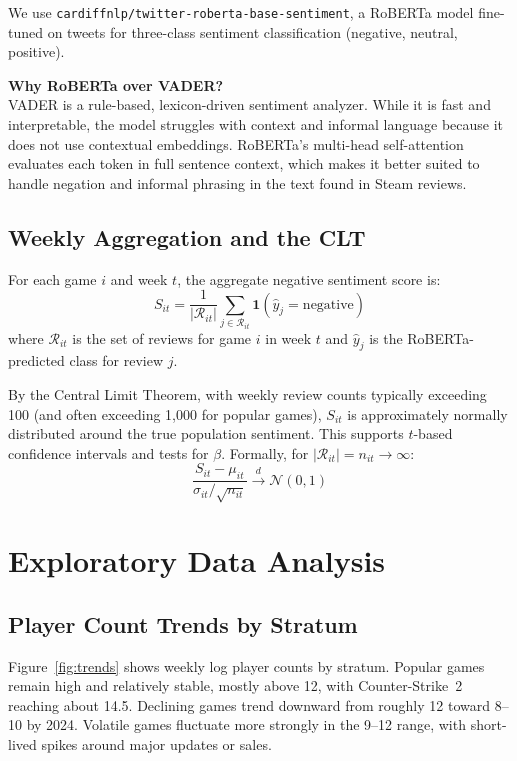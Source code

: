 \documentclass[11pt, letterpaper]{article}
\begin{document}
We use \texttt{cardiffnlp/twitter-roberta-base-sentiment}, a RoBERTa model fine-tuned on tweets for three-class sentiment classification (negative, neutral, positive).

\medskip\noindent\textbf{Why RoBERTa over VADER?}
\\VADER is a rule-based, lexicon-driven sentiment analyzer.
While it is fast and interpretable, the model struggles with context and informal language because it does not use contextual embeddings.
RoBERTa's multi-head self-attention evaluates each token in full sentence context, which makes it better suited to handle negation and informal phrasing in the text found in Steam reviews.

\subsection{Weekly Aggregation and the CLT}

For each game $i$ and week $t$, the aggregate negative sentiment score is:
\begin{equation}
    S_{it} = \frac{1}{|\mathcal{R}_{it}|} \sum_{j \in \mathcal{R}_{it}} \mathbf{1}(\hat{y}_j = \text{negative})
\end{equation}
where $\mathcal{R}_{it}$ is the set of reviews for game $i$ in week $t$ and $\hat{y}_j$ is the RoBERTa-predicted class for review $j$.

By the Central Limit Theorem, with weekly review counts typically exceeding 100 (and often exceeding 1{,}000 for popular games), $S_{it}$ is approximately normally distributed around the true population sentiment.
This supports $t$-based confidence intervals and tests for $\beta$.
Formally, for $|\mathcal{R}_{it}| = n_{it} \to \infty$:
\[
    \frac{S_{it} - \mu_{it}}{\sigma_{it}/\sqrt{n_{it}}} \xrightarrow{d} \mathcal{N}(0,1)
\]

\section{Exploratory Data Analysis}\label{sec:eda}

\subsection{Player Count Trends by Stratum}

Figure~\ref{fig:trends} shows weekly log player counts by stratum.
Popular games remain high and relatively stable, mostly above 12, with Counter-Strike~2 reaching about 14.5.
Declining games trend downward from roughly 12 toward 8--10 by 2024.
Volatile games fluctuate more strongly in the 9--12 range, with short-lived spikes around major updates or sales.
\end{document}
